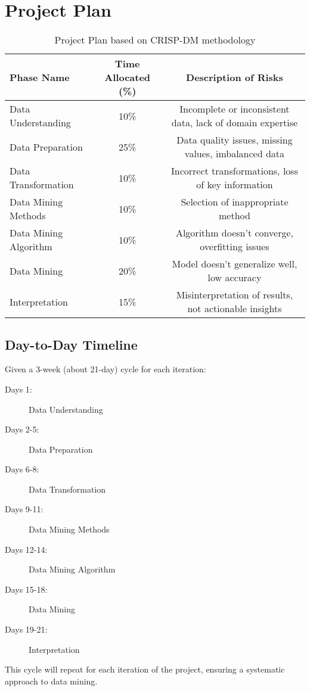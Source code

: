     \section{Project Plan}
        \begin{table}[ht]
            \centering
            \begin{tabularx}{\textwidth}{lcc}
                \toprule
                \textbf{Phase Name}   & \textbf{Time Allocated (\%)} & \textbf{Description of Risks}                             \\
                \midrule
                Data Understanding    & 10\%                         & Incomplete or inconsistent data, lack of domain expertise \\
                Data Preparation      & 25\%                         & Data quality issues, missing values, imbalanced data      \\
                Data Transformation   & 10\%                         & Incorrect transformations, loss of key information        \\
                Data Mining Methods   & 10\%                         & Selection of inappropriate method                         \\
                Data Mining Algorithm & 10\%                         & Algorithm doesn't converge, overfitting issues            \\
                Data Mining           & 20\%                         & Model doesn't generalize well, low accuracy               \\
                Interpretation        & 15\%                         & Misinterpretation of results, not actionable insights     \\
                \bottomrule
            \end{tabularx}
            \caption{Project Plan based on CRISP-DM methodology}
            \label{table:projectplan}
        \end{table}

        \subsection{Day-to-Day Timeline}

            Given a 3-week (about 21-day) cycle for each iteration:

            \begin{description}
                \item[Days 1:] Data Understanding
                \item[Days 2-5:] Data Preparation
                \item[Days 6-8:] Data Transformation
                \item[Days 9-11:] Data Mining Methods
                \item[Days 12-14:] Data Mining Algorithm
                \item[Days 15-18:] Data Mining
                \item[Days 19-21:] Interpretation
            \end{description}

            This cycle will repeat for each iteration of the project, ensuring a systematic approach to data mining.
